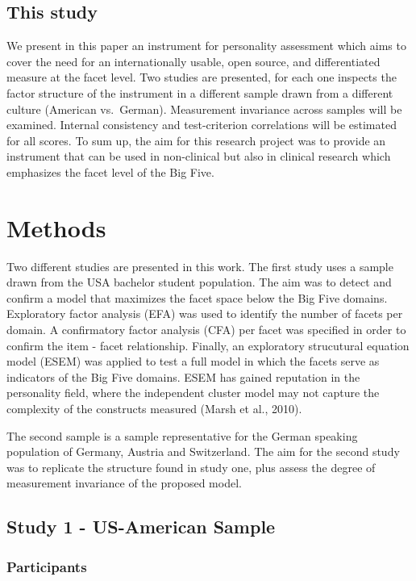 \documentclass[,man,floatsintext]{apa6}
\begin{document}
\subsection{This study}\label{this-study}

We present in this paper an instrument for personality assessment which
aims to cover the need for an internationally usable, open source, and
differentiated measure at the facet level. Two studies are presented,
for each one inspects the factor structure of the instrument in a
different sample drawn from a different culture (American vs.~German).
Measurement invariance across samples will be examined. Internal
consistency and test-criterion correlations will be estimated for all
scores. To sum up, the aim for this research project was to provide an
instrument that can be used in non-clinical but also in clinical
research which emphasizes the facet level of the Big Five.

\section{Methods}\label{methods}

Two different studies are presented in this work. The first study uses a
sample drawn from the USA bachelor student population. The aim was to
detect and confirm a model that maximizes the facet space below the Big
Five domains. Exploratory factor analysis (EFA) was used to identify the
number of facets per domain. A confirmatory factor analysis (CFA) per
facet was specified in order to confirm the item - facet relationship.
Finally, an exploratory strucutural equation model (ESEM) was applied to
test a full model in which the facets serve as indicators of the Big
Five domains. ESEM has gained reputation in the personality field, where
the independent cluster model may not capture the complexity of the
constructs measured (Marsh et al., 2010).

The second sample is a sample representative for the German speaking
population of Germany, Austria and Switzerland. The aim for the second
study was to replicate the structure found in study one, plus assess the
degree of measurement invariance of the proposed model.

\subsection{Study 1 - US-American
Sample}\label{study-1---us-american-sample}

\subsubsection{Participants}\label{participants}
\end{document}
